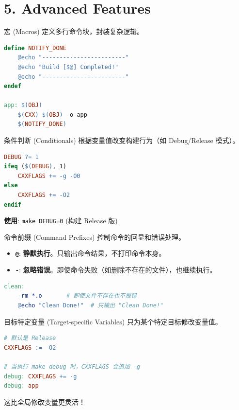 \documentclass[aspectratio=169,10pt]{beamer}
\begin{document}
\section{5. Advanced Features}

\begin{frame}[fragile,shrink=12]{宏 (Macros)}
\footnotesize
定义多行命令块，封装复杂逻辑。

\begin{lstlisting}[language=make]
define NOTIFY_DONE
    @echo "------------------------"
    @echo "Build [$@] Completed!"
    @echo "------------------------"
endef

app: $(OBJ)
    $(CXX) $(OBJ) -o app
    $(NOTIFY_DONE)
\end{lstlisting}
\end{frame}

\begin{frame}[fragile,shrink=12]{条件判断 (Conditionals)}
\footnotesize
根据变量值改变构建行为（如 Debug/Release 模式）。

\begin{lstlisting}[language=make]
DEBUG ?= 1
ifeq ($(DEBUG), 1)
    CXXFLAGS += -g -O0
else
    CXXFLAGS += -O2
endif
\end{lstlisting}

\textbf{使用}: \texttt{make\ DEBUG=0} (构建 Release 版)
\end{frame}

\begin{frame}[fragile,shrink=12]{命令前缀 (Command Prefixes)}
\footnotesize
控制命令的回显和错误处理。

\begin{itemize}
\item
  \textbf{\texttt{@}}: \textbf{静默执行}。只输出命令结果，不打印命令本身。
\item
  \textbf{\texttt{-}}: \textbf{忽略错误}。即使命令失败（如删除不存在的文件），也继续执行。
\end{itemize}

\begin{lstlisting}[language=make]
clean:
    -rm *.o       # 即使文件不存在也不报错
    @echo "Clean Done!"  # 只输出 "Clean Done!"
\end{lstlisting}
\end{frame}

\begin{frame}[fragile,shrink=12]{目标特定变量 (Target-specific Variables)}
\footnotesize
只为某个特定目标修改变量值。

\begin{lstlisting}[language=make]
# 默认是 Release
CXXFLAGS := -O2

# 当执行 make debug 时，CXXFLAGS 会追加 -g
debug: CXXFLAGS += -g
debug: app
\end{lstlisting}

这比全局修改变量更灵活！
\end{frame}
\end{document}
